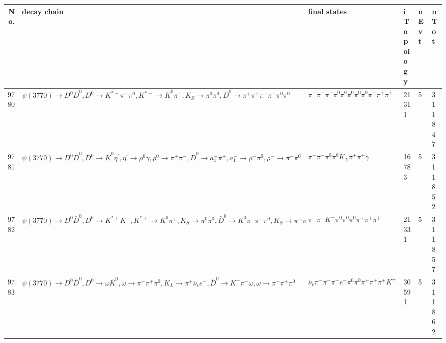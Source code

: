 \begin{table}[htbp] 
\begin{center}
\begin{small}
\begin{tabular}{rlllll}\hline\hline
 No. & decay chain & final states &  iTopology & nEvt & nTot \\\hline
9780&$\psi(3770) \rightarrow D^{0} \bar{D}^{0} , D^{0}  \rightarrow K^{*-}         \pi^{+}        \pi^{0}        , K^{*-}          \rightarrow \bar{K}^{0}   \pi^{-}        , K_{S}           \rightarrow \pi^{0}        \pi^{0}        , \bar{D}^{0}  \rightarrow \pi^{+}        \pi^{+}        \pi^{-}        \pi^{-}        \pi^{0}        \pi^{0}        $&$\pi^{-}        \pi^{-}        \pi^{-}        \pi^{0}        \pi^{0}        \pi^{0}        \pi^{0}        \pi^{0}        \pi^{+}        \pi^{+}        \pi^{+}        $&21311&    5&311847\\
9781&$\psi(3770) \rightarrow D^{0} \bar{D}^{0} , D^{0}  \rightarrow \bar{K}^{0}   \eta^{\prime} , \eta^{\prime}  \rightarrow \rho^{0}      \gamma       , \rho^{0}       \rightarrow \pi^{+}        \pi^{-}        , \bar{D}^{0}  \rightarrow a_{1}^{-}      \pi^{+}        , a_{1}^{-}       \rightarrow \rho^{-}      \pi^{0}        , \rho^{-}       \rightarrow \pi^{-}        \pi^{0}        $&$\pi^{-}        \pi^{-}        \pi^{0}        \pi^{0}        K_{L}          \pi^{+}        \pi^{+}        \gamma       $&16783&    5&311852\\
9782&$\psi(3770) \rightarrow D^{0} \bar{D}^{0} , D^{0}  \rightarrow K^{*+}         K^{-}          , K^{*+}          \rightarrow K^{0}          \pi^{+}        , K_{S}           \rightarrow \pi^{0}        \pi^{0}        , \bar{D}^{0}  \rightarrow K^{0}          \pi^{-}        \pi^{+}        \pi^{0}        , K_{S}           \rightarrow \pi^{+}        \pi^{-}        $&$\pi^{-}        \pi^{-}        K^{-}          \pi^{0}        \pi^{0}        \pi^{0}        \pi^{+}        \pi^{+}        \pi^{+}        $&21331&    5&311857\\
9783&$\psi(3770) \rightarrow D^{0} \bar{D}^{0} , D^{0}  \rightarrow \omega         \bar{K}^{0}   , \omega          \rightarrow \pi^{-}        \pi^{+}        \pi^{0}        , K_{L}           \rightarrow \pi^{+}        \bar{\nu}_{e}    e^{-}        , \bar{D}^{0}  \rightarrow K^{+}          \pi^{-}        \omega         , \omega          \rightarrow \pi^{-}        \pi^{+}        \pi^{0}        $&$\bar{\nu}_{e}    \pi^{-}        \pi^{-}        \pi^{-}        e^{-}        \pi^{0}        \pi^{0}        \pi^{+}        \pi^{+}        \pi^{+}        K^{+}          $&30591&    5&311862\\

\end{tabular}
\end{small}
\end{center}
\end{table}
